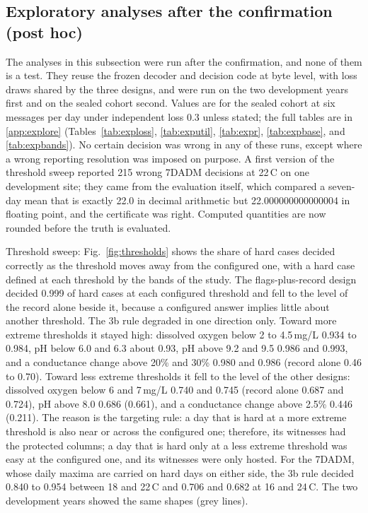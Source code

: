 \subsection{Exploratory analyses after the confirmation (post hoc)}
\label{sec:explore}
The analyses in this subsection were run after the confirmation, and none of them is a test. They reuse the frozen decoder and decision code at byte level, with loss draws shared by the three designs, and were run on the two development years first and on the sealed cohort second. Values are for the sealed cohort at six messages per day under independent loss 0.3 unless stated; the full tables are in \ref{app:explore} (Tables~\ref{tab:exploss}, \ref{tab:exputil}, \ref{tab:expr}, \ref{tab:expbase}, and \ref{tab:expbands}). No certain decision was wrong in any of these runs, except where a wrong reporting resolution was imposed on purpose. A first version of the threshold sweep reported 215 wrong 7DADM decisions at 22\,\textdegree C on one development site; they came from the evaluation itself, which compared a seven-day mean that is exactly 22.0 in decimal arithmetic but 22.000000000000004 in floating point, and the certificate was right. Computed quantities are now rounded before the truth is evaluated.

Threshold sweep: Fig.~\ref{fig:thresholds} shows the share of hard cases decided correctly as the threshold moves away from the configured one, with a hard case defined at each threshold by the bands of the study. The flags-plus-record design decided 0.999 of hard cases at each configured threshold and fell to the level of the record alone beside it, because a configured answer implies little about another threshold. The 3b rule degraded in one direction only. Toward more extreme thresholds it stayed high: dissolved oxygen below 2 to 4.5\,mg/L 0.934 to 0.984, pH below 6.0 and 6.3 about 0.93, pH above 9.2 and 9.5 0.986 and 0.993, and a conductance change above 20\% and 30\% 0.980 and 0.986 (record alone 0.46 to 0.70). Toward less extreme thresholds it fell to the level of the other designs: dissolved oxygen below 6 and 7\,mg/L 0.740 and 0.745 (record alone 0.687 and 0.724), pH above 8.0 0.686 (0.661), and a conductance change above 2.5\% 0.446 (0.211). The reason is the targeting rule: a day that is hard at a more extreme threshold is also near or across the configured one; therefore, its witnesses had the protected columns; a day that is hard only at a less extreme threshold was easy at the configured one, and its witnesses were only hosted. For the 7DADM, whose daily maxima are carried on hard days on either side, the 3b rule decided 0.840 to 0.954 between 18 and 22\,\textdegree C and 0.706 and 0.682 at 16 and 24\,\textdegree C. The two development years showed the same shapes (grey lines).

